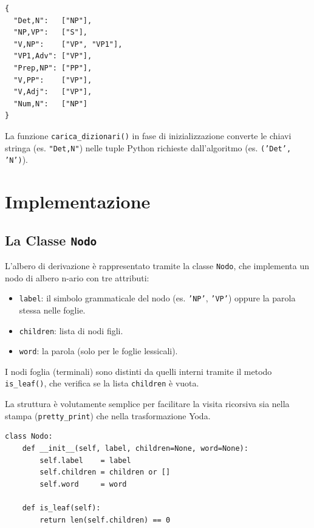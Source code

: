 \documentclass[12pt, a4paper]{article}
\begin{document}
\begin{lstlisting}[language={},caption={Esempio di regole binarie (formato chiave-valore invertito)}]
{
  "Det,N":   ["NP"],
  "NP,VP":   ["S"],
  "V,NP":    ["VP", "VP1"],
  "VP1,Adv": ["VP"],
  "Prep,NP": ["PP"],
  "V,PP":    ["VP"],
  "V,Adj":   ["VP"],
  "Num,N":   ["NP"]
}
\end{lstlisting}

La funzione \texttt{carica\_dizionari()} in fase di inizializzazione converte le
chiavi stringa (es. \texttt{"Det,N"}) nelle tuple Python richieste dall'algoritmo
(es. \texttt{('Det', 'N')}).

\section{Implementazione}

\subsection{La Classe \texttt{Nodo}}

L'albero di derivazione è rappresentato tramite la classe \texttt{Nodo}, che
implementa un nodo di albero n-ario con tre attributi:

\begin{itemize}
    \item \texttt{label}: il simbolo grammaticale del nodo (es. \texttt{'NP'},
          \texttt{'VP'}) oppure la parola stessa nelle foglie.
    \item \texttt{children}: lista di nodi figli.
    \item \texttt{word}: la parola (solo per le foglie lessicali).
\end{itemize}

I nodi foglia (terminali) sono distinti da quelli interni tramite il metodo
\texttt{is\_leaf()}, che verifica se la lista \texttt{children} è vuota.

La struttura è volutamente semplice per facilitare la visita ricorsiva sia nella
stampa (\texttt{pretty\_print}) che nella trasformazione Yoda.

\begin{lstlisting}[caption={Classe Nodo -- costruttore e metodi principali}]
class Nodo:
    def __init__(self, label, children=None, word=None):
        self.label    = label
        self.children = children or []
        self.word     = word

    def is_leaf(self):
        return len(self.children) == 0
\end{lstlisting}
\end{document}
